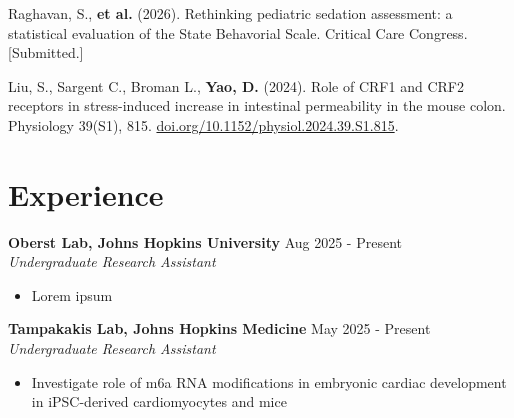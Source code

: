 \documentclass[11pt]{article}       %
\begin{document}
\vspace {5pt}

Raghavan, S., \textbf{et al.} (2026). Rethinking pediatric sedation assessment: a statistical evaluation of the State Behavorial Scale. Critical Care Congress. [Submitted.] \\

\vspace{5pt}

Liu, S., Sargent C., Broman L., \textbf{Yao, D.} (2024). Role of CRF1 and CRF2 receptors in stress-induced increase in intestinal permeability in the mouse colon. Physiology 39(S1), 815. \href{https://doi.org/10.1152/physiol.2024.39.S1.815}{doi.org/10.1152/physiol.2024.39.S1.815}.

\vspace{-9pt}






\section*{Experience}

\textbf{Oberst Lab, Johns Hopkins University} \hfill Aug 2025 - Present \\
\textit{Undergraduate Research Assistant} \vspace{-9pt} \\
\begin{itemize}
  \item Lorem ipsum
\end{itemize}

\textbf{Tampakakis Lab, Johns Hopkins Medicine} \hfill May 2025 - Present \\
\textit{Undergraduate Research Assistant} \vspace{-9pt} \\
\begin{itemize}
  \item Investigate role of m6a RNA modifications in embryonic cardiac development in iPSC-derived cardiomyocytes and mice
\end{itemize}
\end{document}
